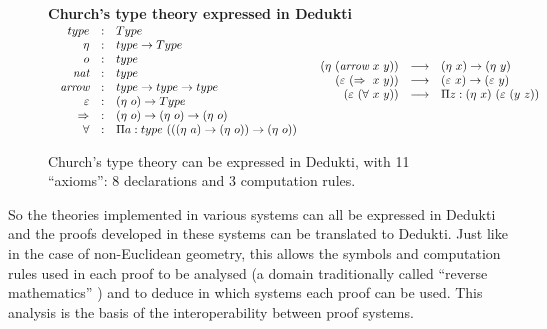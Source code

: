 \begin{figure}
\begin{shaded}
  \begin{center}
    {\bf\Large Church's type theory expressed in Dedukti}\\[3mm]
    $\begin{array}{cc}
      \begin{array}{rcl}
        type&:&Type\\
        \eta&:&type \rightarrow Type\\
        o&:&type\\
        \mbox{\it nat}&:&type\\
        \mbox{\it arrow}&:&type \rightarrow type \rightarrow type\\
        \varepsilon&:&(\eta~o) \rightarrow Type\\
        \Rightarrow&:&(\eta~o) \rightarrow (\eta~o) \rightarrow (\eta~o)\\
        \forall&:&\Pi a:type~(((\eta~a) \rightarrow (\eta~o)) \rightarrow (\eta~o))\\
      \end{array}
      &\begin{array}{rcl}
         (\eta~(\mbox{\it arrow}~x~y)) &\longrightarrow& (\eta~x) \rightarrow (\eta~y)\\
         (\varepsilon~(\Rightarrow~x~y)) &\longrightarrow& (\varepsilon~x) \rightarrow (\varepsilon~y)\\
         (\varepsilon~(\forall~x~y)) &\longrightarrow& \Pi z:(\eta~x)~(\varepsilon~(y~z))
       \end{array}\\
    \end{array}$
  \end{center}
\end{shaded}
\caption{Church's type theory can be expressed in Dedukti, with 11
  ``axioms'': 8 declarations and 3 computation
  rules. \label{church-type-theory}}
\end{figure}

So the theories implemented in various systems can all be expressed in
Dedukti and the proofs developed in these systems can be translated to
Dedukti. Just like in the case of non-Euclidean geometry, this allows
the symbols and computation rules used in each proof to be analysed
\cite{Thire18,Dowek17} (a domain traditionally called ``reverse
mathematics'' \cite{Friedman75,Simpson09}) and to deduce in which
systems each proof can be used.  This analysis is the basis of the
interoperability between proof systems.

